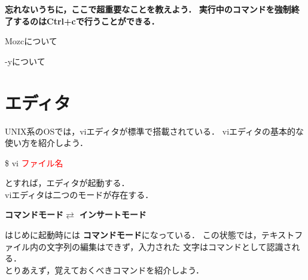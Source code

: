 \documentclass[dvipdfmx,a4paper,11pt]{jsbook}
\begin{document}
{\Huge
\textbf{忘れないうちに，ここで超重要なことを教えよう．}
\textbf{実行中のコマンドを強制終了するのはCtrl+cで行うことができる．}
}

\begin{subbox}{Mozcについて}

\end{subbox}


\begin{subbox}{-yについて}

\end{subbox}

\section{エディタ}
UNIX系のOSでは，viエディタが標準で搭載されている．
viエディタの基本的な使い方を紹介しよう．
\begin{tcolorbox}[terminalbox]
  \$ vi \textcolor{red}{ファイル名}
\end{tcolorbox}
\noindent とすれば，エディタが起動する．\\
viエディタは二つのモードが存在する．
\begin{center}
  \textbf{コマンドモード}$\rightleftarrows$ \textbf{インサートモード}
\end{center}
はじめに起動時には
\textbf{コマンドモード}になっている．
この状態では，テキストファイル内の文字列の編集はできず，入力された
文字はコマンドとして認識される．\\
とりあえず，覚えておくべきコマンドを紹介しよう．
\end{document}
